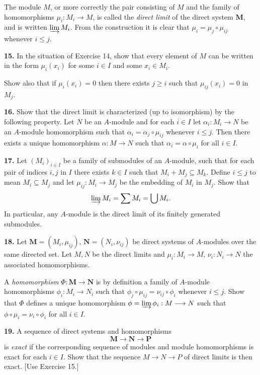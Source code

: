 The module $M$, or more correctly the pair consisting of $M$ and the family of
homomorphisms $\mu_i:M_i\longrightarrow M$, is called the \emph{direct limit} of the direct system $\mathbf M$,
and is written $\varinjlim M_i$.  From the construction it is clear that $\mu_i=\mu_j\circ\mu_{ij}$
whenever $i\leq j$.

\medskip
\noindent\textbf{15.} In the situation of Exercise 14, show that every element of $M$ can be written in
the form $\mu_i(x_i)$ for some $i\in I$ and some $x_i\in M_i$.

Show also that if $\mu_i(x_i)=0$ then there exists $j\geq i$ such that $\mu_{ij}(x_i)=0$
in $M_j$.

\medskip
\noindent\textbf{16.} Show that the direct limit is characterized (up to isomorphism) by the following
property.  Let $N$ be an $A$-module and for each $i\in I$ let $\alpha_i:M_i\longrightarrow N$ be an $A$-module homomorphism such that $\alpha_i=\alpha_j\circ\mu_{ij}$ whenever $i\leq j$.  Then there exists
a unique homomorphism $\alpha:M\longrightarrow N$ such that $\alpha_i=\alpha\circ\mu_i$ for all $i\in I$.

\medskip
\noindent\textbf{17.} Let $(M_i)_{i\in I}$ be a family of submodules of an $A$-module, such that for each pair of
indices $i,j$ in $I$ there exists $k\in I$ such that $M_i+M_j\subseteq M_k$.  Define $i\leq j$ to
mean $M_i\subseteq M_j$ and let $\mu_{ij}:M_i\longrightarrow M_j$ be the embedding of $M_i$ in $M_j$.  Show that
\[
\varinjlim M_i=\sum M_i=\bigcup M_i.
\]
In particular, any $A$-module is the direct limit of its finitely generated submodules.

\medskip
\noindent\textbf{18.} Let $\mathbf M=(M_i,\mu_{ij})$, $\mathbf N=(N_i,\nu_{ij})$ be direct systems of $A$-modules over the same
directed set.  Let $M,N$ be the direct limits and $\mu_i:M_i\longrightarrow M$, $\nu_i:N_i\longrightarrow N$ the
associated homomorphisms.

A \emph{homomorphism} $\Phi:\mathbf M\longrightarrow\mathbf N$ is by definition a family of $A$-module homomorphisms $\phi_i:M_i\longrightarrow N_i$ such that $\phi_j\circ\mu_{ij}=\nu_{ij}\circ\phi_i$ whenever $i\leq j$.  Show that
$\Phi$ defines a unique homomorphism $\phi=\varinjlim\phi_i:M\longrightarrow N$ such that $\phi\circ\mu_i=
\nu_i\circ\phi_i$ for all $i\in I$.

\medskip
\noindent\textbf{19.} A sequence of direct systems and homomorphisms
\[
\mathbf M\longrightarrow\mathbf N\longrightarrow\mathbf P
\]
is \emph{exact} if the corresponding sequence of modules and module homomorphisms
is exact for each $i\in I$.  Show that the sequence $M\longrightarrow N\longrightarrow P$ of direct limits is
then exact.  [Use Exercise 15.]

